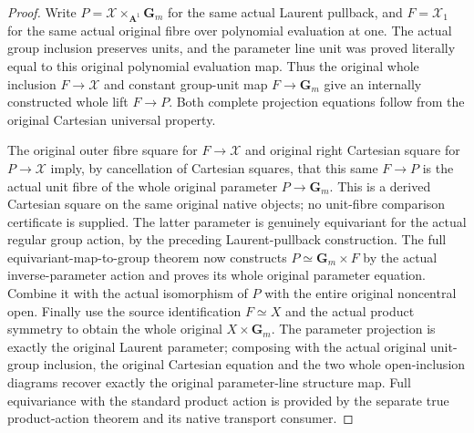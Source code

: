 \begin{proof}
Write $P=\mathcal X\times_{\mathbf A^1}\mathbf G_m$ for the
same actual Laurent pullback, and $F=\mathcal X_1$ for the
same actual original fibre over polynomial evaluation at one.
The actual group inclusion preserves units, and the parameter
line unit was proved literally equal to this original
polynomial evaluation map. Thus the original whole inclusion
$F\to\mathcal X$ and constant group-unit map $F\to\mathbf G_m$
give an internally constructed whole lift $F\to P$.
Both complete projection equations follow from the original
Cartesian universal property.

The original outer fibre square for $F\to\mathcal X$ and
original right Cartesian square for $P\to\mathcal X$ imply,
by cancellation of Cartesian squares, that this same $F\to P$
is the actual unit fibre of the whole original parameter
$P\to\mathbf G_m$. This is a derived Cartesian square on
the same original native objects; no unit-fibre comparison
certificate is supplied. The latter parameter is genuinely
equivariant for the actual regular group action, by the
preceding Laurent-pullback construction.
The full equivariant-map-to-group theorem now constructs
$P\simeq\mathbf G_m\times F$ by the actual inverse-parameter
action and proves its whole original parameter equation.
Combine it with the actual isomorphism of $P$ with the
entire original noncentral open. Finally use the source
identification $F\simeq X$ and the actual product symmetry
to obtain the whole original $X\times\mathbf G_m$.
The parameter projection is exactly the original Laurent
parameter; composing with the actual original unit-group
inclusion, the original Cartesian equation and the two
whole open-inclusion diagrams recover exactly the original
parameter-line structure map. Full equivariance with the
standard product action is provided by the separate true
product-action theorem and its native transport consumer.
\end{proof}
